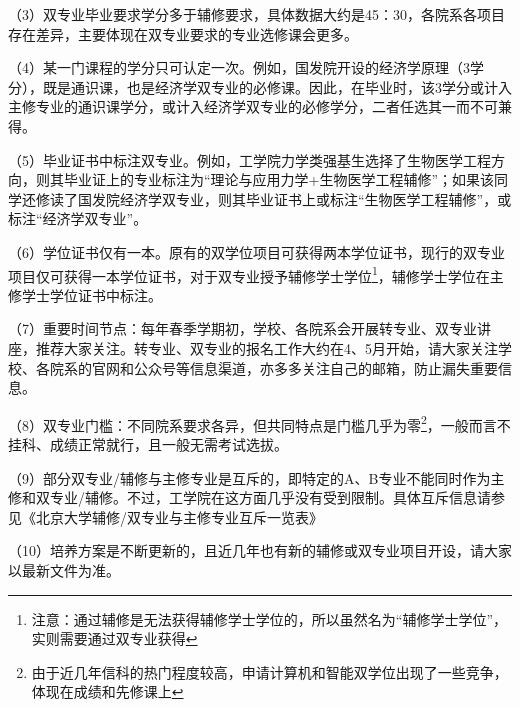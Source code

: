 \documentclass[11pt,oneside]{book}
\begin{document}
\vspace{10pt}

（3）双专业毕业要求学分多于辅修要求，具体数据大约是45：30，各院系各项目存在差异，主要体现在双专业要求的专业选修课会更多。

\vspace{10pt}

（4）某一门课程的学分只可认定一次。例如，国发院开设的经济学原理（3学分），既是通识课，也是经济学双专业的必修课。因此，在毕业时，该3学分或计入主修专业的通识课学分，或计入经济学双专业的必修学分，二者任选其一而不可兼得。

\vspace{10pt}

（5）毕业证书中标注双专业。例如，工学院力学类强基生选择了生物医学工程方向，则其毕业证上的专业标注为“理论与应用力学+生物医学工程辅修”；如果该同学还修读了国发院经济学双专业，则其毕业证书上或标注“生物医学工程辅修”，或标注“经济学双专业”。

\vspace{10pt}

（6）学位证书仅有一本。原有的双学位项目可获得两本学位证书，现行的双专业项目仅可获得一本学位证书，对于双专业授予辅修学士学位\footnote{注意：通过辅修是无法获得辅修学士学位的，所以虽然名为“辅修学士学位”，实则需要通过双专业获得}，辅修学士学位在主修学士学位证书中标注。

\vspace{10pt}

（7）重要时间节点：每年春季学期初，学校、各院系会开展转专业、双专业讲座，推荐大家关注。转专业、双专业的报名工作大约在4、5月开始，请大家关注学校、各院系的官网和公众号等信息渠道，亦多多关注自己的邮箱，防止漏失重要信息。

\vspace{10pt}

（8）双专业门槛：不同院系要求各异，但共同特点是门槛几乎为零\footnote{由于近几年信科的热门程度较高，申请计算机和智能双学位出现了一些竞争，体现在成绩和先修课上}，一般而言不挂科、成绩正常就行，且一般无需考试选拔。

\vspace{10pt}

（9）部分双专业/辅修与主修专业是互斥的，即特定的A、B专业不能同时作为主修和双专业/辅修。不过，工学院在这方面几乎没有受到限制。具体互斥信息请参见《北京大学辅修/双专业与主修专业互斥一览表》

\vspace{10pt}

（10）培养方案是不断更新的，且近几年也有新的辅修或双专业项目开设，请大家以最新文件为准。
\end{document}
